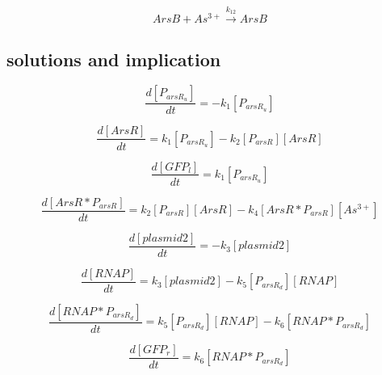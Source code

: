\begin{equation}
ArsB+As^{3+}\stackrel{k_{12}}{\longrightarrow}ArsB
\end{equation}



\subsection{solutions and implication}

\begin{equation}
\frac{d[P_{arsR_u}]}{dt}=-k_1[P_{arsR_u}]\tag{1}
\end{equation}

\begin{equation}
\frac{d[ArsR]}{dt}=k_1[P_{arsR_u}]-k_2[P_{arsR}][ArsR]\tag{2}
\end{equation}

\begin{equation}
\frac{d[GFP_l]}{dt}=k_1[P_{arsR_u}]\tag{3}
\end{equation}

\begin{equation}
\frac{d[ArsR*P_{arsR}]}{dt}=k_2[P_{arsR}][ArsR]-k_4[ArsR*P_{arsR} ][As^{3+}] \tag{4}
\end{equation}

\begin{equation}
\frac{d[plasmid2]}{dt}=-k_3[plasmid2]\tag{5}
\end{equation}

\begin{equation}
\frac{d[RNAP]}{dt}=k_3[plasmid2]-k_5[P_{arsR_d}][RNAP]\tag{6}
\end{equation}

\begin{equation}
\frac{d [RNAP*P_{arsR_d}]}{dt}=k_5[P_{arsR_d}][RNAP]-k_6[RNAP*P_{arsR_d}]\tag{7}
\end{equation}

\begin{equation}
\frac{d [GFP_r]}{dt}=k_6[RNAP*P_{arsR_d}]\tag{8}
\end{equation}





